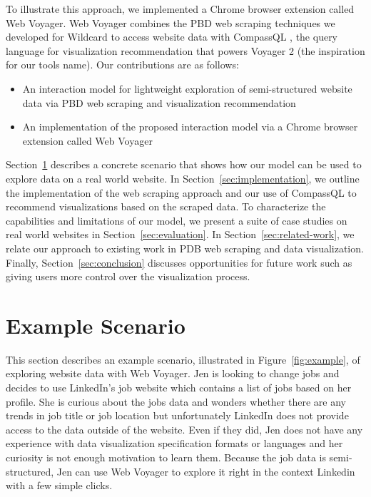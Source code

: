\documentclass[sigconf,screen]{acmart}
\providecommand{\tightlist}{%
  \setlength{\itemsep}{0pt}\setlength{\parskip}{0pt}}
\begin{document}
To illustrate this approach, we implemented a Chrome browser extension
called Web Voyager. Web Voyager combines the PBD web scraping techniques
we developed for Wildcard \citep{litt2020} to access website data with
CompassQL \citep{wongsuphasawat2016}, the query language for
visualization recommendation that powers Voyager 2
\citep{wongsuphasawat2017} (the inspiration for our tools name). Our
contributions are as follows:

\begin{itemize}
\tightlist
\item
  An interaction model for lightweight exploration of semi-structured
  website data via PBD web scraping and visualization recommendation
\item
  An implementation of the proposed interaction model via a Chrome
  browser extension called Web Voyager
\end{itemize}

Section~\ref{sec:example} describes a concrete scenario that shows how
our model can be used to explore data on a real world website. In
Section~\ref{sec:implementation}, we outline the implementation of the
web scraping approach and our use of CompassQL to recommend
visualizations based on the scraped data. To characterize the
capabilities and limitations of our model, we present a suite of case
studies on real world websites in Section~\ref{sec:evaluation}. In
Section~\ref{sec:related-work}, we relate our approach to existing work
in PDB web scraping and data visualization. Finally,
Section~\ref{sec:conclusion} discusses opportunities for future work
such as giving users more control over the visualization process.

\hypertarget{sec:example}{%
\section{Example Scenario}\label{sec:example}}

This section describes an example scenario, illustrated in
Figure~\ref{fig:example}, of exploring website data with Web Voyager.
Jen is looking to change jobs and decides to use LinkedIn's job website
which contains a list of jobs based on her profile. She is curious about
the jobs data and wonders whether there are any trends in job title or
job location but unfortunately LinkedIn does not provide access to the
data outside of the website. Even if they did, Jen does not have any
experience with data visualization specification formats or languages
and her curiosity is not enough motivation to learn them. Because the
job data is semi-structured, Jen can use Web Voyager to explore it right
in the context Linkedin with a few simple clicks.
\end{document}
